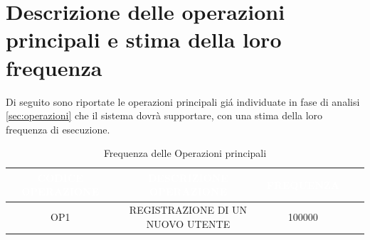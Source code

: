 \documentclass[a4paper,12pt]{report}
\begin{document}
\section{Descrizione delle operazioni principali e stima della loro frequenza}\label{sec:frequenza}
Di seguito sono riportate le operazioni principali giá individuate in fase di analisi \ref{sec:operazioni}
che il sistema dovrà supportare, con una stima della loro frequenza di esecuzione.
\begin{xltabular}{\textwidth}{|C|C|C|C|C|}
    \caption{Frequenza delle Operazioni principali} \label{tab:frequenza}\\
    \hline
     \textcolor{white}{\uppercase{codice operazione}} & \textcolor{white}{\uppercase{descrizione operazione}} & \textcolor{white}{\uppercase{frequenza}} \\
    \hline
    \endhead
    \uppercase{op1} & \uppercase{registrazione di un nuovo utente} & 100000 \\
    \hline
\end{xltabular}
\end{document}
